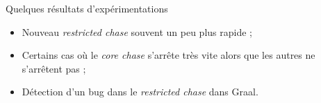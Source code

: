 \begin{frame}{Quelques résultats d'expérimentations}
    \begin{itemize}
        \item Nouveau \textit{restricted chase} souvent un peu plus rapide ;
        \item<2-> Certains cas où le \textit{core chase} s'arrête très vite alors que les autres ne s'arrêtent pas ;
        \item<3-> Détection d'un bug dans le \textit{restricted chase} dans Graal.
    \end{itemize}
\end{frame}

